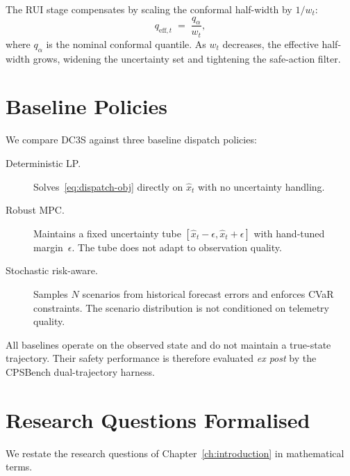 The RUI stage compensates by scaling the conformal half-width by
$1/w_t$:
\begin{equation}
\label{eq:rui-inflation}
  q_{\mathrm{eff},t} \;=\; \frac{q_{\alpha}}{w_t},
\end{equation}
where $q_{\alpha}$ is the nominal conformal quantile.  As $w_t$
decreases, the effective half-width grows, widening the uncertainty set
and tightening the safe-action filter.

\section{Baseline Policies}
\label{sec:baselines}

We compare DC3S against three baseline dispatch policies:

\begin{description}
  \item[Deterministic LP.]  Solves~\eqref{eq:dispatch-obj} directly on
    $\hat{x}_t$ with no uncertainty handling.
  \item[Robust MPC.]  Maintains a fixed uncertainty tube
    $[\hat{x}_t - \epsilon, \hat{x}_t + \epsilon]$ with hand-tuned
    margin~$\epsilon$.  The tube does not adapt to observation quality.
  \item[Stochastic risk-aware.]  Samples $N$ scenarios from historical
    forecast errors and enforces CVaR constraints.  The scenario
    distribution is not conditioned on telemetry quality.
\end{description}

All baselines operate on the observed state and do not maintain a
true-state trajectory.  Their safety performance is therefore evaluated
\emph{ex post} by the CPSBench dual-trajectory harness.

\section{Research Questions Formalised}
\label{sec:rqs-formal}

We restate the research questions of Chapter~\ref{ch:introduction} in
mathematical terms.

